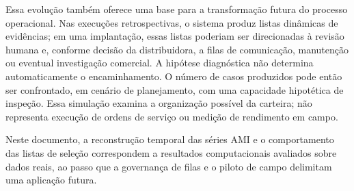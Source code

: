 Essa evolução também oferece uma base para a transformação futura do processo operacional. Nas execuções retrospectivas, o sistema produz listas dinâmicas de evidências; em uma implantação, essas listas poderiam ser direcionadas à revisão humana e, conforme decisão da distribuidora, a filas de comunicação, manutenção ou eventual investigação comercial. A hipótese diagnóstica não determina automaticamente o encaminhamento. O número de casos produzidos pode então ser confrontado, em cenário de planejamento, com uma capacidade hipotética de inspeção. Essa simulação examina a organização possível da carteira; não representa execução de ordens de serviço ou medição de rendimento em campo.

Neste documento, a reconstrução temporal das séries AMI e o comportamento das listas de seleção correspondem a resultados computacionais avaliados sobre dados reais, ao passo que a governança de filas e o piloto de campo delimitam uma aplicação futura.



